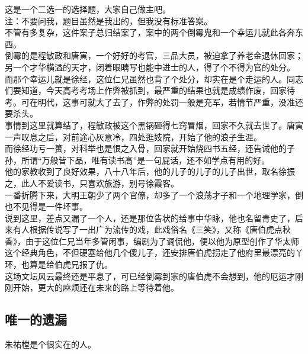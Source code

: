 \begin{multicols}{\theparacolNo}
这是一个二选一的选择题，大家自己做主吧。\\

注：不要问我，题目虽然是我出的，但我没有标准答案。\\

不管有多复杂，这件案子总归结案了，案中的两个倒霉鬼和一个幸运儿就此各奔东西。\\

倒霉的是程敏政和唐寅，一个好好的考官，三品大员，被迫拿了养老金退休回家；另一个才华横溢的天才，闭着眼睛写也能中进士的人，得了个不得为官的处分。\\

而那个幸运儿就是徐经，这位仁兄虽然也背了个处分，却实在是个走运的人。同志们要知道，今天高考考场上作弊被抓到，最严重的结果也就是成绩作废，回家待考。可在明代，这事可就大了去了，作弊的处罚一般是充军，若情节严重，没准还要杀头。\\

事情到这里就算结了，程敏政被这个黑锅砸得七窍冒烟，回家不久就去世了。唐寅一声叹息之后，对前途心灰意冷，四处逛妓院，开始了他的浪子生涯。\\

而徐经功亏一篑，对科举也是恨之入骨，回家就开始烧四书五经，还告诫他的子孙，所谓“万般皆下品，唯有读书高”是一句屁话，还不如学点有用的好。\\

他的家教收到了良好效果，八十八年后，他的儿子的儿子的儿子出世，取名徐振之，此人不爱读书，只喜欢旅游，别号徐霞客。\\

一番折腾下来，大明王朝少了两个官僚，却多了一个浪荡才子和一个地理学家，倒也不见得是一件坏事。\\

说到这里，差点又漏了一个人，还是那位告状的给事中华眿，他也名留青史了，后来有人根据传说写了一出广为流传的戏，此戏俗名《三笑》，又称《唐伯虎点秋香》，由于这位仁兄当年多管闲事，编剧为了调侃他，便以他为原型创作了华太师这个经典角色，不但硬塞给他几个傻儿子，还安排唐伯虎拐走了他府里最漂亮的丫环，也算是给伯虎兄报了仇。\\

这场文坛风云最终还是平息了，可已经倒霉到家的唐伯虎不会想到，他的厄运才刚刚开始，更大的麻烦还在未来的路上等待着他。\\

\subsection{唯一的遗漏}
朱祐樘是个很实在的人。\\


\end{multicols}
